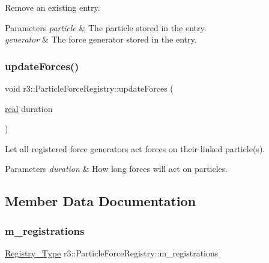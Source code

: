 Remove an existing entry. 


\begin{DoxyParams}{Parameters}
{\em particle} & The particle stored in the entry. \\
\hline
{\em generator} & The force generator stored in the entry. \\
\hline
\end{DoxyParams}
\mbox{\label{classr3_1_1_particle_force_registry_aff16efc19c65d28e39a38cbc936ede2a}} 
\subsubsection{\texorpdfstring{update\+Forces()}{updateForces()}}
{\footnotesize\ttfamily void r3\+::\+Particle\+Force\+Registry\+::update\+Forces (\begin{DoxyParamCaption}\item[{\mbox{\hyperlink{namespacer3_ab2016b3e3f743fb735afce242f0dc1eb}{real}}}]{duration }\end{DoxyParamCaption})}



Let all registered force generators act forces on their linked particle(s). 


\begin{DoxyParams}{Parameters}
{\em duration} & How long forces will act on particles. \\
\hline
\end{DoxyParams}


\subsection{Member Data Documentation}
\mbox{\label{classr3_1_1_particle_force_registry_ac0130d368fb6f3f8894bc83b615e193f}} 
\subsubsection{\texorpdfstring{m\+\_\+registrations}{m\_registrations}}
{\footnotesize\ttfamily \mbox{\hyperlink{classr3_1_1_particle_force_registry_ae769e654dbf539cf09c514e47768498c}{Registry\+\_\+\+Type}} r3\+::\+Particle\+Force\+Registry\+::m\+\_\+registrations\hspace{0.3cm}{\ttfamily [protected]}}



